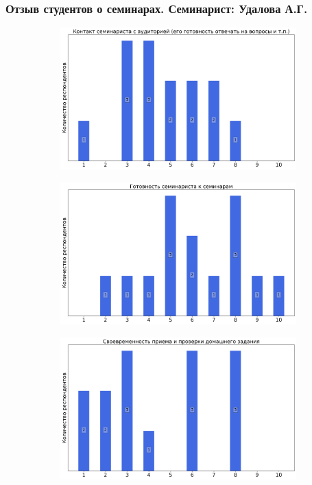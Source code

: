 	\subsubsection{Отзыв студентов о семинарах. Семинарист: Удалова А.Г.}
		\begin{figure}[H]
			\centering
			\begin{subfigure}[b]{0.45\textwidth}
				\centering
				\includegraphics[width=\textwidth]{images/1 course/Общая физика - механика/seminarists-marks-Удалова А.Г.-0.png}
			\end{subfigure}
			\begin{subfigure}[b]{0.45\textwidth}
				\centering
				\includegraphics[width=\textwidth]{images/1 course/Общая физика - механика/seminarists-marks-Удалова А.Г.-1.png}
			\end{subfigure}
			\begin{subfigure}[b]{0.45\textwidth}
				\centering
				\includegraphics[width=\textwidth]{images/1 course/Общая физика - механика/seminarists-marks-Удалова А.Г.-2.png}

\end{subfigure}
\end{figure}
